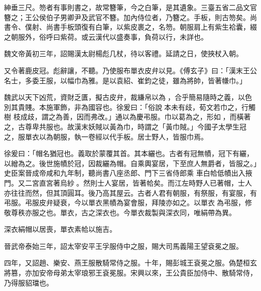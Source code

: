 \begin{pinyinscope}
 紳垂三尺。笏者有事則書之，故常簪筆，今之白筆，是其遺象。三臺五省二品文官簪之；王公侯伯子男卿尹及武官不簪。加內侍位者，乃簪之。手板，則古笏矣。尚書令、僕射、尚書手板頭復有白筆，以紫皮裹之，名笏。朝服肩上有紫生袷囊，綴之朝服外，俗呼曰紫荷。或云漢代以盛奏事，負荷以行，未詳也。



 魏文帝黃初三年，詔賜漢太尉楊彪几杖，待以客禮。延請之日，使挾杖入朝。



 又令著鹿皮冠。彪辭讓，不聽。乃使服布單衣皮弁以見。《傅玄子》曰：「漢末王公名士，多委王服，以幅巾為雅。是以袁紹、崔鈞之徒，雖為將帥，皆著㡘巾。」



 魏武以天下凶荒，資財乏匱，擬古皮弁，裁縑帛以為𢂿，合乎簡易隨時之義，以色別其貴賤。本施軍飾，非為國容也。徐爰曰：「俗說𢂿本未有歧，荀文若巾之，行觸樹
 枝成歧，謂之為善，因而弗改。」通以為慶弔服。巾以葛為之，形如𢂿，而橫著之，古尊卑共服也。故漢末妖賊以黃為巾，時謂之「黃巾賊。」今國子太學生冠之，服單衣以為朝服，執一卷經以代手板。居士野人，皆服巾焉。



 徐爰曰：「帽名猶冠也。義取於蒙覆其首。其本纚也。古者有冠無幘，冠下有纚，以繒為之。後世施幘於冠，因裁纚為帽。自乘輿宴居，下至庶人無爵者，皆服之。」史臣案晉成帝咸和九年制，聽尚書八座丞郎、門下三省侍郎乘
 車白帢低幘出入掖門。又二宮直宮著烏紗𢂿。然則士人宴居，皆著帢矣。而江左時野人已著帽，士人亦往往而然，但其頂圓耳。後乃高其屋云。古者人君有朝服，有祭服，有宴服，有弔服。弔服皮弁疑衰，今以單衣黑幘為宴會服，拜陵亦如之。以單衣𢂿為弔服，修敬尊秩亦服之也。單衣，古之深衣也。今單衣裁製與深衣同，唯絹帶為異。



 深衣絹帽以居喪，單衣素帢以施吉。



 晉武帝泰始三年，詔太宰安平王孚服侍中之服，賜大司馬義陽王望袞冕之服。



 四年，又詔趙、樂安、燕王服散騎常侍之服。十年，賜彭城王袞冕之服。偽楚桓玄將篡，亦加安帝母弟太宰琅邪王袞冕服。宋興以來，王公貴臣加侍中、散騎常侍，乃得服貂璫也。




\end{pinyinscope}
